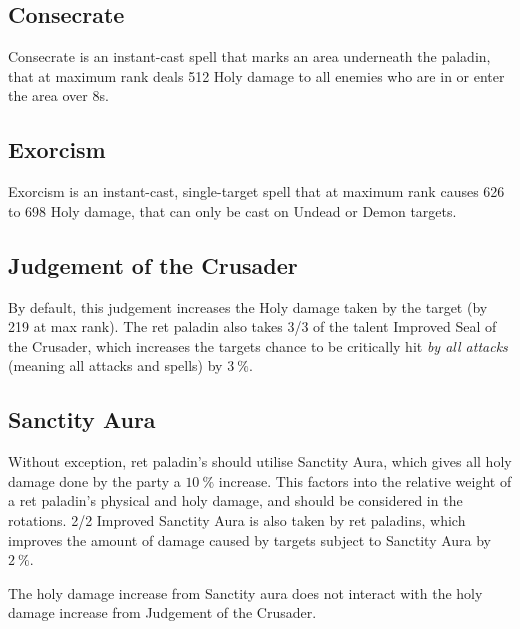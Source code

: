 \documentclass[letterpaper,11pt]{article}
\begin{document}
	\subsection{Consecrate}
	Consecrate is an instant-cast spell that marks an area underneath the paladin, that at maximum rank deals 512 Holy damage to all enemies who are in or enter the area over 8s.

	
	\subsection{Exorcism}
	Exorcism is an instant-cast, single-target spell that at maximum rank causes 626 to 698 Holy damage, that can only be cast on Undead or Demon targets.
	
	
	\subsection{Judgement of the Crusader}
	By default, this judgement increases the Holy damage taken by the target (by 219 at max rank).
	The ret paladin also takes 3/3 of the talent Improved Seal of the Crusader, which increases the targets chance to be critically hit \emph{by all attacks} (meaning all attacks and spells) by $3~\%$.	
	
	\subsection{Sanctity Aura}
	Without exception, ret paladin's should utilise Sanctity Aura, which gives all holy damage done by the party a $10~\%$ increase.
	This factors into the relative weight of a ret paladin's physical and holy damage, and should be considered in the rotations.
	2/2 Improved Sanctity Aura is also taken by ret paladins, which improves the amount of damage caused by targets subject to Sanctity Aura by $2~\%$.
	
	The holy damage increase from Sanctity aura does not interact with the holy damage increase from Judgement of the Crusader.
	

	

	\appendix
	
\end{document}

